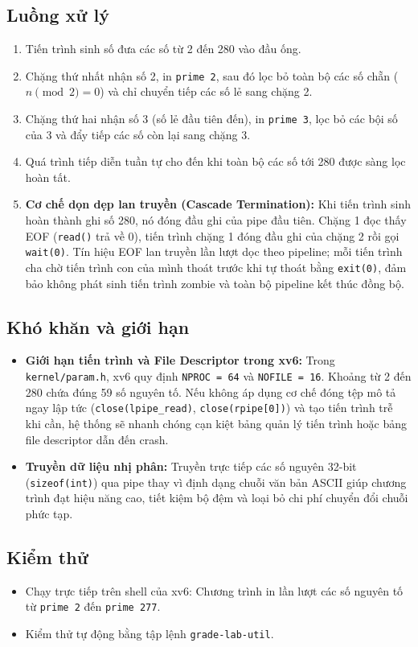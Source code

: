 \subsection{Luồng xử lý}
\begin{enumerate}
  \item Tiến trình sinh số đưa các số từ 2 đến 280 vào đầu ống.
  \item Chặng thứ nhất nhận số 2, in \texttt{prime 2}, sau đó lọc bỏ toàn bộ các số chẵn ($n \pmod 2 = 0$) và chỉ chuyển tiếp các số lẻ sang chặng 2.
  \item Chặng thứ hai nhận số 3 (số lẻ đầu tiên đến), in \texttt{prime 3}, lọc bỏ các bội số của 3 và đẩy tiếp các số còn lại sang chặng 3.
  \item Quá trình tiếp diễn tuần tự cho đến khi toàn bộ các số tới 280 được sàng lọc hoàn tất.
  \item \textbf{Cơ chế dọn dẹp lan truyền (Cascade Termination):} Khi tiến trình sinh hoàn thành ghi số 280, nó đóng đầu ghi của pipe đầu tiên. Chặng 1 đọc thấy EOF (\texttt{read()} trả về 0), tiến trình chặng 1 đóng đầu ghi của chặng 2 rồi gọi \texttt{wait(0)}. Tín hiệu EOF lan truyền lần lượt dọc theo pipeline; mỗi tiến trình cha chờ tiến trình con của mình thoát trước khi tự thoát bằng \texttt{exit(0)}, đảm bảo không phát sinh tiến trình zombie và toàn bộ pipeline kết thúc đồng bộ.
\end{enumerate}

\subsection{Khó khăn và giới hạn}
\begin{itemize}
  \item \textbf{Giới hạn tiến trình và File Descriptor trong xv6:} Trong \texttt{kernel/param.h}, xv6 quy định \texttt{NPROC = 64} và \texttt{NOFILE = 16}. Khoảng từ 2 đến 280 chứa đúng 59 số nguyên tố. Nếu không áp dụng cơ chế đóng tệp mô tả ngay lập tức (\texttt{close(lpipe\_read)}, \texttt{close(rpipe[0])}) và tạo tiến trình trễ khi cần, hệ thống sẽ nhanh chóng cạn kiệt bảng quản lý tiến trình hoặc bảng file descriptor dẫn đến crash.
  \item \textbf{Truyền dữ liệu nhị phân:} Truyền trực tiếp các số nguyên 32-bit (\texttt{sizeof(int)}) qua pipe thay vì định dạng chuỗi văn bản ASCII giúp chương trình đạt hiệu năng cao, tiết kiệm bộ đệm và loại bỏ chi phí chuyển đổi chuỗi phức tạp.
\end{itemize}

\subsection{Kiểm thử}
\begin{itemize}
  \item Chạy trực tiếp trên shell của xv6: Chương trình in lần lượt các số nguyên tố từ \texttt{prime 2} đến \texttt{prime 277}.
  \item Kiểm thử tự động bằng tập lệnh \texttt{grade-lab-util}.
\end{itemize}

